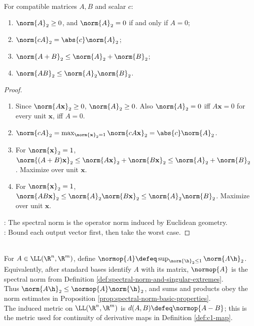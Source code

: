 \begin{proposition} \label{prop:spectral-norm-basic-properties} \\
For compatible matrices $A,B$ and scalar $c$:
\begin{enumerate}[label=(\roman*)]
\setlength{\itemsep}{0pt}
\item $\norm{A}_2\geq0$, and $\norm{A}_2=0$ if and only if $A=0$;
\item $\norm{cA}_2=\abs{c}\norm{A}_2$;
\item $\norm{A+B}_2\leq\norm{A}_2+\norm{B}_2$;
\item $\norm{AB}_2\leq\norm{A}_2\norm{B}_2$.
\end{enumerate}
\begin{proof}
\begin{enumerate}[label=(\roman*)]
\setlength{\itemsep}{0pt}
\item Since $\norm{A\mathbf{x}}_2\geq0$, $\norm{A}_2\geq0$. Also $\norm{A}_2=0$ iff $A\mathbf{x}=0$ for every unit $\mathbf{x}$, iff $A=0$.
\item $\norm{cA}_2=\max_{\norm{\mathbf{x}}_2=1}\norm{cA\mathbf{x}}_2=\abs{c}\norm{A}_2$.
\item For $\norm{\mathbf{x}}_2=1$, $\norm{(A+B)\mathbf{x}}_2\leq\norm{A\mathbf{x}}_2+\norm{B\mathbf{x}}_2\leq\norm{A}_2+\norm{B}_2$. Maximize over unit $\mathbf{x}$.
\item For $\norm{\mathbf{x}}_2=1$, $\norm{AB\mathbf{x}}_2\leq\norm{A}_2\norm{B\mathbf{x}}_2\leq\norm{A}_2\norm{B}_2$. Maximize over unit $\mathbf{x}$.
\end{enumerate}
: The spectral norm is the operator norm induced by Euclidean geometry.\\
: Bound each output vector first, then take the worst case.
\end{proof}
\end{proposition}

\begin{definition} \label{def:operator-norm-rn-rm} \\
For $A\in\LL(\R^n,\R^m)$, define $\normop{A}\defeq \sup_{\norm{\h}_2\leq1}\norm{A\h}_2$.\\
Equivalently, after standard bases identify $A$ with its matrix, $\normop{A}$ is the spectral norm from Definition \ref{def:spectral-norm-and-singular-extremes}.\\
Thus $\norm{A\h}_2\leq\normop{A}\norm{\h}_2$, and sums and products obey the norm estimates in Proposition \ref{prop:spectral-norm-basic-properties}.\\
The induced metric on $\LL(\R^n,\R^m)$ is $d(A,B)\defeq\normop{A-B}$; this is the metric used for continuity of derivative maps in Definition \ref{def:c1-map}.
\end{definition}

